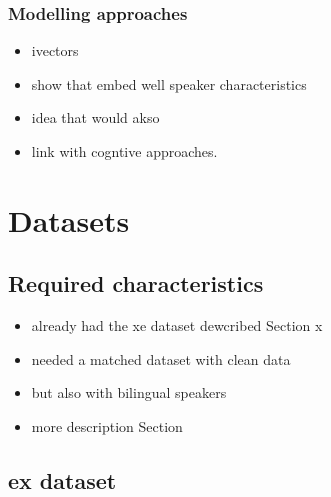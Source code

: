 \subsubsection{Modelling approaches}

\begin{itemize}
    \renewcommand\labelitemi{--}
    \item ivectors
    \item show that embed well speaker characteristics
    \item idea that would akso 
    \item link with cogntive approaches. 
\end{itemize}

\section{Datasets}

\subsection{Required characteristics}

\begin{itemize}
    \renewcommand\labelitemi{--}
    \item already had the xe dataset dewcribed Section x
    \item needed a matched dataset with clean data
    \item but also with bilingual speakers
    \item more description Section
\end{itemize}






\subsection{\acrshort{ex} dataset} \label{Section: ex dataset}

